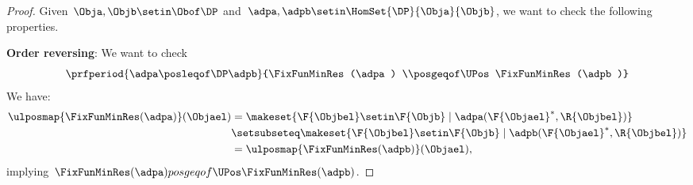 \begin{proof}
    Given~$\Obja,\Objb \setin \Obof\DP$ and~$\adpa,\adpb \setin \HomSet{\DP}{\Obja}{\Objb}$, we want to check the following properties.

    \textbf{Order reversing}:
    We want to check
    \begin{equation}
        \prfperiod{\adpa \posleqof\DP \adpb}{\FixFunMinRes(\adpa) \\posgeqof\UPos \FixFunMinRes(\adpb)}
    \end{equation}
    We have:
    \begin{equation}
        \begin{aligned}
            \ulposmap{\FixFunMinRes(\adpa)}(\Objael) & =\makeset{\F{\Objbel} \setin \F{\Objb} \mid \adpa(\F{\Objael}^*, \R{\Objbel})} \\
                                                     & \setsubseteq \makeset{\F{\Objbel} \setin \F{\Objb} \mid \adpb(\F{\Objael}^*, \R{\Objbel})} \\
                                                     & = \ulposmap{\FixFunMinRes(\adpb)}(\Objael),
        \end{aligned}
    \end{equation}
    implying~$\FixFunMinRes(\adpa) \\posgeqof\UPos \FixFunMinRes(\adpb)$.


\end{proof}
